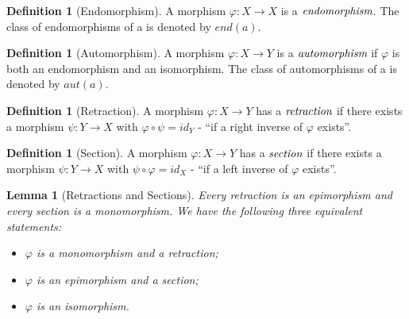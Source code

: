 \documentclass[10pt, oneside, reqno]{amsart}
\theoremstyle{plain}%
\newtheorem{lem}[thm]{Lemma}
\theoremstyle{definition}
\newtheorem{defn}[thm]{Definition}
\theoremstyle{remark}
\newcommand{\Id}{\mathit{id}_}
\begin{document}
\begin{defn}[Endomorphism]
 A morphism $\varphi: X \to X$ is a $\emph{endomorphism}$.
 The class of endomorphisms of a is denoted by $end(a)$.
\end{defn}

\begin{defn}[Automorphism]
 A morphism $\varphi: X \to Y$ is a $\emph{automorphism}$ if $\varphi$ is both an endomorphism and an isomorphism.
 The class of automorphisms of a is denoted by $aut(a)$.
\end{defn}

\begin{defn}[Retraction]
 A morphism $\varphi: X \to Y$ has a $\emph{retraction}$ if there exists a morphism $\psi: Y \to X$ with $\varphi \circ \psi = \Id{Y}$ - ``if a right inverse of $\varphi$ exists''.
\end{defn}

\begin{defn}[Section]
 A morphism $\varphi: X \to Y$ has a $\emph{section}$ if there exists a morphism $\psi: Y \to X$ with $\psi \circ \varphi = \Id{X}$ - ``if a left inverse of $\varphi$ exists''.
\end{defn}

\begin{lem}[Retractions and Sections]
Every retraction is an epimorphism and every section is a monomorphism.
We have the following three equivalent statements:
\begin{itemize}
\item $\varphi$ is a monomorphism and a retraction;
\item $\varphi$ is an epimorphism and a section;
\item $\varphi$ is an isomorphism.
\end{itemize}
\end{lem}
\end{document}
